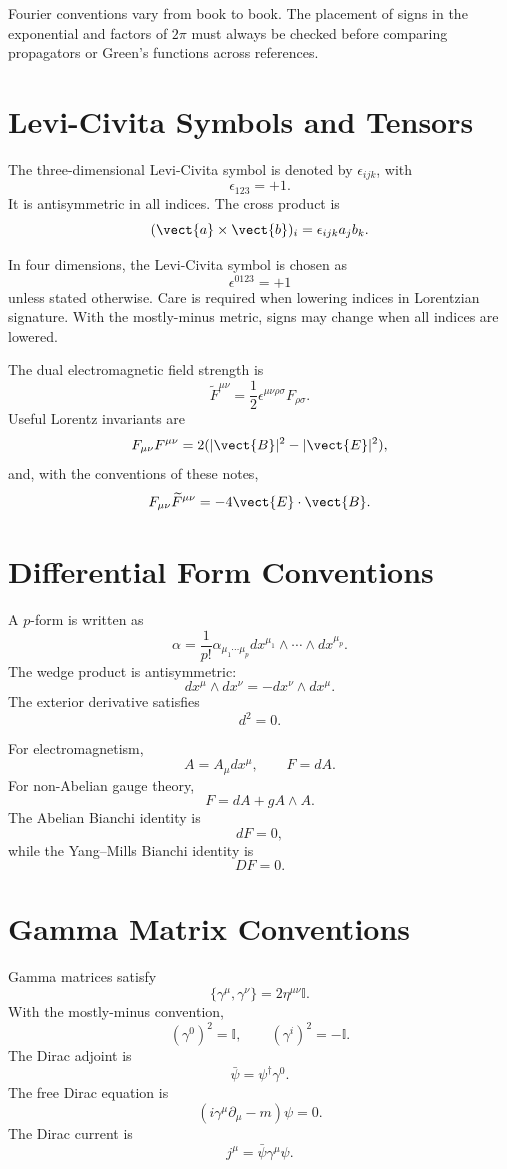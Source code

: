 \begin{remarkbox}
Fourier conventions vary from book to book. The placement of signs in the
exponential and factors of \(2\pi\) must always be checked before comparing
propagators or Green's functions across references.
\end{remarkbox}

\section{Levi-Civita Symbols and Tensors}

The three-dimensional Levi-Civita symbol is denoted by \(\epsilon_{ijk}\), with
\[
    \epsilon_{123}=+1.
\]
It is antisymmetric in all indices. The cross product is
\[
    (\vect{a}\times\vect{b})_i=\epsilon_{ijk}a_jb_k.
\]

In four dimensions, the Levi-Civita symbol is chosen as
\[
    \epsilon^{0123}=+1
\]
unless stated otherwise. Care is required when lowering indices in Lorentzian
signature. With the mostly-minus metric, signs may change when all indices are
lowered.

The dual electromagnetic field strength is
\[
    \widetilde{F}^{\mu\nu}=\frac{1}{2}\epsilon^{\mu\nu\rho\sigma}F_{\rho\sigma}.
\]
Useful Lorentz invariants are
\[
    F_{\mu\nu}F^{\mu\nu}=2(|\vect{B}|^2-|\vect{E}|^2),
\]
and, with the conventions of these notes,
\[
    F_{\mu\nu}\widetilde{F}^{\mu\nu}=-4\vect{E}\cdot\vect{B}.
\]

\section{Differential Form Conventions}

A \(p\)-form is written as
\[
    \alpha=\frac{1}{p!}\alpha_{\mu_1\cdots\mu_p}
    dx^{\mu_1}\wedge\cdots\wedge dx^{\mu_p}.
\]
The wedge product is antisymmetric:
\[
    dx^\mu\wedge dx^\nu=-dx^\nu\wedge dx^\mu.
\]
The exterior derivative satisfies
\[
    d^2=0.
\]

For electromagnetism,
\[
    A=A_\mu dx^\mu,
    \qquad
    F=dA.
\]
For non-Abelian gauge theory,
\[
    F=dA+gA\wedge A.
\]
The Abelian Bianchi identity is
\[
    dF=0,
\]
while the Yang--Mills Bianchi identity is
\[
    DF=0.
\]

\section{Gamma Matrix Conventions}

Gamma matrices satisfy
\[
    \{\gamma^\mu,\gamma^\nu\}=2\eta^{\mu\nu}\mathbb{I}.
\]
With the mostly-minus convention,
\[
    (\gamma^0)^2=\mathbb{I},
    \qquad
    (\gamma^i)^2=-\mathbb{I}.
\]
The Dirac adjoint is
\[
    \bar\psi=\psi^\dagger\gamma^0.
\]
The free Dirac equation is
\[
    (i\gamma^\mu\partial_\mu-m)\psi=0.
\]
The Dirac current is
\[
    j^\mu=\bar\psi\gamma^\mu\psi.
\]

